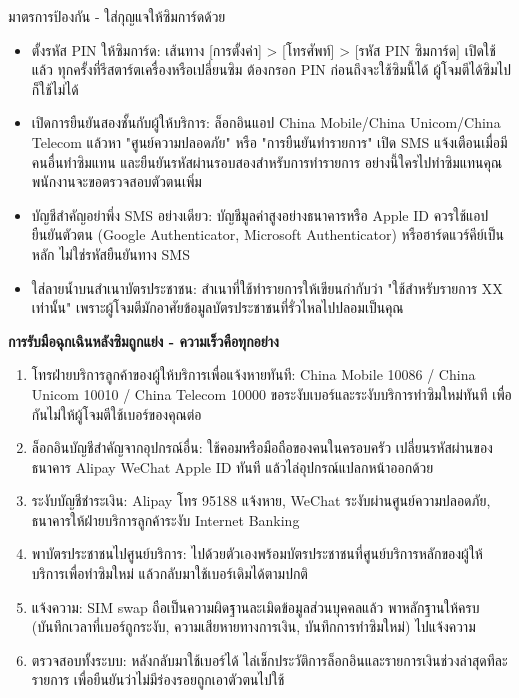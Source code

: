 \begin{tcbwarn}{มาตรการป้องกัน - ใส่กุญแจให้ซิมการ์ดด้วย}
\begin{itemize}
  \item ตั้งรหัส PIN ให้ซิมการ์ด: เส้นทาง [การตั้งค่า] > [โทรศัพท์] > [รหัส PIN ซิมการ์ด] เปิดใช้แล้ว ทุกครั้งที่รีสตาร์ตเครื่องหรือเปลี่ยนซิม ต้องกรอก PIN ก่อนถึงจะใช้ซิมนี้ได้ ผู้โจมตีได้ซิมไปก็ใช้ไม่ได้
  \item เปิดการยืนยันสองชั้นกับผู้ให้บริการ: ล็อกอินแอป China Mobile/China Unicom/China Telecom แล้วหา "ศูนย์ความปลอดภัย" หรือ "การยืนยันทำรายการ" เปิด SMS แจ้งเตือนเมื่อมีคนอื่นทำซิมแทน และยืนยันรหัสผ่านรอบสองสำหรับการทำรายการ อย่างนี้ใครไปทำซิมแทนคุณ พนักงานจะขอตรวจสอบตัวตนเพิ่ม
  \item บัญชีสำคัญอย่าพึ่ง SMS อย่างเดียว: บัญชีมูลค่าสูงอย่างธนาคารหรือ Apple ID ควรใช้แอปยืนยันตัวตน (Google Authenticator, Microsoft Authenticator) หรือฮาร์ดแวร์คีย์เป็นหลัก ไม่ใช่รหัสยืนยันทาง SMS
  \item ใส่ลายน้ำบนสำเนาบัตรประชาชน: สำเนาที่ใช้ทำรายการให้เขียนกำกับว่า "ใช้สำหรับรายการ XX เท่านั้น" เพราะผู้โจมตีมักอาศัยข้อมูลบัตรประชาชนที่รั่วไหลไปปลอมเป็นคุณ
\end{itemize}

\end{tcbwarn}

\textbf{การรับมือฉุกเฉินหลังซิมถูกแย่ง - ความเร็วคือทุกอย่าง}\par

\begin{enumerate}
  \item โทรฝ่ายบริการลูกค้าของผู้ให้บริการเพื่อแจ้งหายทันที: China Mobile 10086 / China Unicom 10010 / China Telecom 10000 ขอระงับเบอร์และระงับบริการทำซิมใหม่ทันที เพื่อกันไม่ให้ผู้โจมตีใช้เบอร์ของคุณต่อ
  \item ล็อกอินบัญชีสำคัญจากอุปกรณ์อื่น: ใช้คอมหรือมือถือของคนในครอบครัว เปลี่ยนรหัสผ่านของธนาคาร Alipay WeChat Apple ID ทันที แล้วไล่อุปกรณ์แปลกหน้าออกด้วย
  \item ระงับบัญชีชำระเงิน: Alipay โทร 95188 แจ้งหาย, WeChat ระงับผ่านศูนย์ความปลอดภัย, ธนาคารให้ฝ่ายบริการลูกค้าระงับ Internet Banking
  \item พาบัตรประชาชนไปศูนย์บริการ: ไปด้วยตัวเองพร้อมบัตรประชาชนที่ศูนย์บริการหลักของผู้ให้บริการเพื่อทำซิมใหม่ แล้วกลับมาใช้เบอร์เดิมได้ตามปกติ
  \item แจ้งความ: SIM swap ถือเป็นความผิดฐานละเมิดข้อมูลส่วนบุคคลแล้ว พาหลักฐานให้ครบ (บันทึกเวลาที่เบอร์ถูกระงับ, ความเสียหายทางการเงิน, บันทึกการทำซิมใหม่) ไปแจ้งความ
  \item ตรวจสอบทั้งระบบ: หลังกลับมาใช้เบอร์ได้ ไล่เช็กประวัติการล็อกอินและรายการเงินช่วงล่าสุดทีละรายการ เพื่อยืนยันว่าไม่มีร่องรอยถูกเอาตัวตนไปใช้
\end{enumerate}

